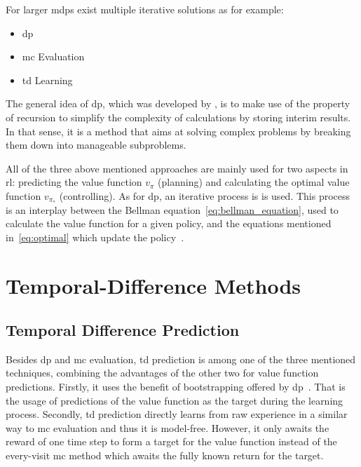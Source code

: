 \documentclass[draft,final]{vutinfth} %
\begin{document}
    For larger \gls{mdp}s exist multiple iterative solutions as for example:
    \begin{itemize}
        \item \gls{dp}
        \item \gls{mc} Evaluation
        \item \gls{td} Learning
    \end{itemize}

    The general idea of \gls{dp}, which was developed by \citeauthor{bellman_theory_1954}, is to make use of the property of recursion to simplify the complexity of calculations by storing interim results.
    In that sense, it is a method that aims at solving complex problems by breaking them down into manageable subproblems.

    All of the three above mentioned approaches are mainly used for two aspects in \gls{rl}: predicting the value function $v_\pi$ (planning) and calculating the optimal value function $v_{\pi_*}$ (controlling).
    As for \gls{dp}, an iterative process is is used.
    This process is an interplay between the Bellman equation~\eqref{eq:bellman_equation}, used to calculate the value function for a given policy, and the equations mentioned in~\eqref{eq:optimal} which update the policy~\citep{silver_lecture_2015,sutton_reinforcement_2018}.


    \section{Temporal-Difference Methods}


    \subsection{Temporal Difference Prediction}
    Besides \gls{dp} and \gls{mc} evaluation, \gls{td} prediction is among one of the three mentioned techniques, combining the advantages of the other two for value function predictions.
    Firstly, it uses the benefit of bootstrapping offered by \gls{dp}~\citep{szepesvari_algorithms_2010}.
    That is the usage of predictions of the value function as the target during the learning process.
    Secondly, \gls{td} prediction directly learns from raw experience in a similar way to \gls{mc} evaluation and thus it is model-free.
    However, it only awaits the reward of one time step to form a target for the value function instead of the every-visit \gls{mc} method which awaits the fully known return for the target.
\end{document}

